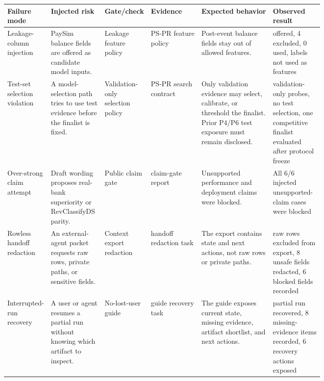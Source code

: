 \documentclass[11pt]{article}
\begin{document}
\begin{center}
\begin{minipage}{\linewidth}
\scriptsize
\setlength{\tabcolsep}{3pt}
\renewcommand{\arraystretch}{1.16}
\begin{tabularx}{\linewidth}{@{}>{\raggedright\arraybackslash}p{0.13\linewidth} >{\raggedright\arraybackslash}p{0.17\linewidth} >{\raggedright\arraybackslash}p{0.13\linewidth} >{\raggedright\arraybackslash}p{0.16\linewidth} >{\raggedright\arraybackslash}X >{\raggedright\arraybackslash}p{0.16\linewidth}@{}}
\toprule
Failure mode & Injected risk & Gate/check & Evidence & Expected behavior & Observed result \\
\midrule
Leakage-column injection & PaySim balance fields are offered as candidate model inputs. & Leakage feature policy & PS-PR feature policy & Post-event balance fields stay out of allowed features. & 4 offered, 4 excluded, 0 used, labels not used as features \\
Test-set selection violation & A model-selection path tries to use test evidence before the finalist is fixed. & Validation-only selection policy & PS-PR search contract & Only validation evidence may select, calibrate, or threshold the finalist. Prior P4/P6 test exposure must remain disclosed. & validation-only probes, no test selection, one competitive finalist evaluated after protocol freeze \\
Over-strong claim attempt & Draft wording proposes real-bank superiority or RevClassifyDS parity. & Public claim gate & claim-gate report & Unsupported performance and deployment claims were blocked. & All 6/6 injected unsupported-claim cases were blocked \\
Rowless handoff redaction & An external-agent packet requests raw rows, private paths, or sensitive fields. & Context export redaction & handoff redaction task & The export contains state and next actions, not raw rows or private paths. & raw rows excluded from export, 8 unsafe fields redacted, 6 blocked fields recorded \\
Interrupted-run recovery & A user or agent resumes a partial run without knowing which artifact to inspect. & No-lost-user guide & guide recovery task & The guide exposes current state, missing evidence, artifact shortlist, and next actions. & partial run recovered, 8 missing-evidence items recorded, 6 recovery actions exposed \\
\bottomrule
\end{tabularx}
\end{minipage}
\end{center}
\end{document}
